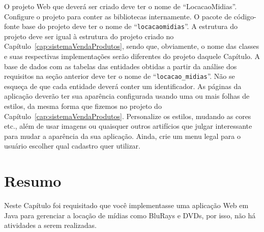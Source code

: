 O projeto Web que deverá ser criado deve ter o nome de ``LocacaoMidias''. Configure o projeto para conter as bibliotecas internamente. O pacote de código-fonte base do projeto deve ter o nome de ``\texttt{locacaomidias}''. A estrutura do projeto deve ser igual à estrutura do projeto criado no Capítulo~\ref{cap:sistemaVendaProdutos}, sendo que, obviamente, o nome das classes e suas respectivas implementações serão diferentes do projeto daquele Capítulo. A base de dados com as tabelas das entidades obtidas a partir da análise dos requisitos na seção anterior deve ter o nome de ``\texttt{locacao\_midias}''. Não se esqueça de que cada entidade deverá conter um identificador. As páginas da aplicação deverão ter sua aparência configurada usando uma ou mais folhas de estilos, da mesma forma que fizemos no projeto do Capítulo~\ref{cap:sistemaVendaProdutos}. Personalize os estilos, mudando as cores etc., além de usar imagens ou quaisquer outros artifícios que julgar interessante para mudar a aparência da sua aplicação. Ainda, crie um menu legal para o usuário escolher qual cadastro quer utilizar.


\section{Resumo}

Neste Capítulo foi requisitado que você implementasse uma aplicação Web em Java para gerenciar a locação de mídias como BluRays e DVDs, por isso, não há atividades a serem realizadas.

